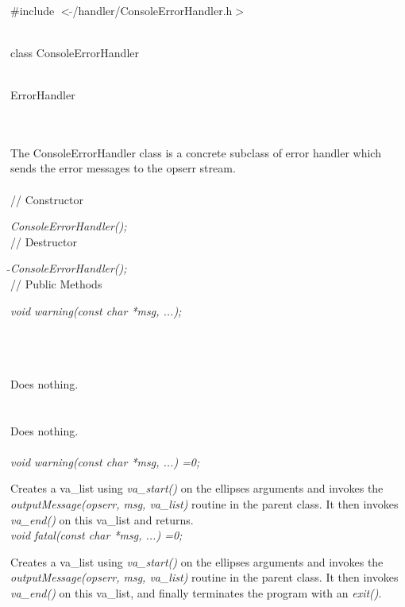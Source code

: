 
   \\
\#include $<\tilde{ }$/handler/ConsoleErrorHandler.h$>$  


  \\
class ConsoleErrorHandler 


 \\
ErrorHandler 

\indent{} \\

  \\
\indent The ConsoleErrorHandler class is a concrete subclass of error
handler which sends the error messages to the opserr stream. \\

 \\
// Constructor 

{\em ConsoleErrorHandler();}\\ 

// Destructor 

{\em $\tilde{ }$ConsoleErrorHandler();}\\ 

// Public Methods  

{\em void warning(const char *msg, ...);}

\\ 

  \\
  \\ 
Does nothing.\\

 \\
\\ 
Does nothing. \\

  \\
{\em void warning(const char *msg, ...) =0;}

Creates a va\_list using {\em va\_start()} on the ellipses arguments
and invokes the {\em outputMessage(opserr, msg, va\_list)} routine in
the parent class. It then invokes  {\em va\_end()} on this va\_list
and returns.\\ 

{\em void fatal(const char *msg, ...) =0;}

Creates a va\_list using {\em va\_start()} on the ellipses arguments
and invokes the {\em outputMessage(opserr, msg, va\_list)} routine in
the parent class. It then invokes {\em va\_end()} on this va\_list,
and finally terminates the program with an {\em exit()}. 
